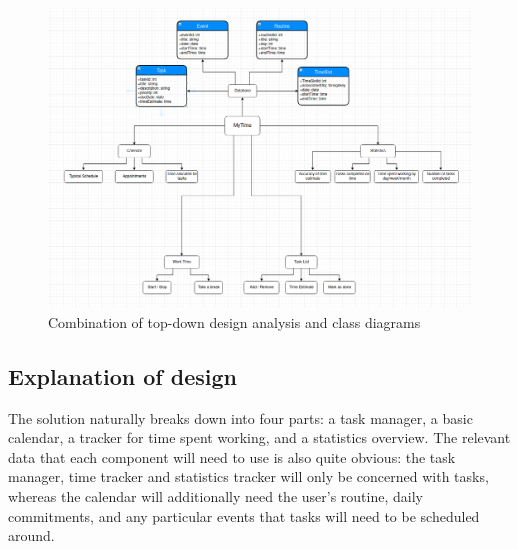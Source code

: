 \documentclass{article}
\begin{document}
\begin{figure}[h]
	\includegraphics[width=\linewidth]{Images/TDD.png}
	\caption{Combination of top-down design analysis and class diagrams}
	\label{fig:TDD1}
\end{figure}

\subsection{Explanation of design}
The solution naturally breaks down into four parts:
a task manager,
a basic calendar,
a tracker for time spent working,
and a statistics overview.
The relevant data that each component will need to use is also quite obvious:
the task manager, time tracker and statistics tracker will only be concerned with tasks,
whereas the calendar will additionally need the user's routine, daily commitments,
and any particular events that tasks will need to be scheduled around.
\end{document}
